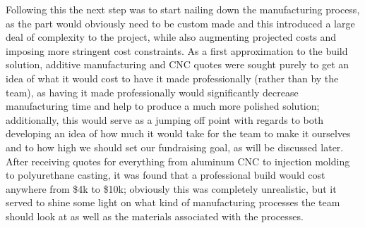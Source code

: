 \documentclass{report}
\begin{document}
Following this the next step was to start nailing down the manufacturing process, as the part would obviously need to be custom made and this introduced a large deal of complexity to the project, while also augmenting projected costs and imposing more stringent cost constraints.  As a first approximation to the build solution, additive manufacturing and CNC quotes were sought purely to get an idea of what it would cost to have it made professionally (rather than by the team), as having it made professionally would significantly decrease manufacturing time and help to produce a much more polished solution; additionally, this would serve as a jumping off point with regards to both developing an idea of how much it would take for the team to make it ourselves and to how high we should set our fundraising goal, as will be discussed later.  After receiving quotes for everything from aluminum CNC to injection molding to polyurethane casting, it was found that a professional build would cost anywhere from \$4k to \$10k; obviously this was completely unrealistic, but it served to shine some light on what kind of manufacturing processes the team should look at as well as the materials associated with the processes. \par
\end{document}
